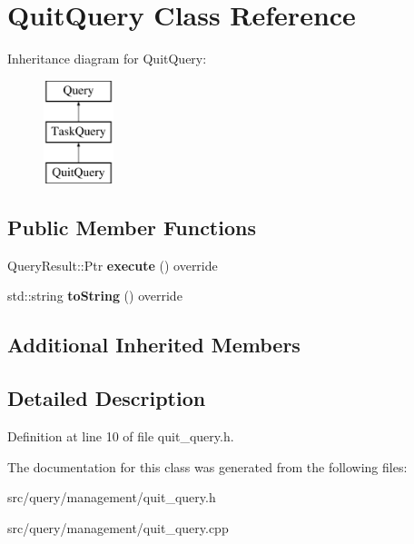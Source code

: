 \hypertarget{class_quit_query}{}\section{Quit\+Query Class Reference}
\label{class_quit_query}
Inheritance diagram for Quit\+Query\+:\begin{figure}[H]
\begin{center}
\leavevmode
\includegraphics[height=3.000000cm]{class_quit_query}
\end{center}
\end{figure}
\subsection*{Public Member Functions}
\begin{DoxyCompactItemize}
\item 
\mbox{\label{class_quit_query_a89c1e8a2fbb5948e627599bb2929de72}} 
Query\+Result\+::\+Ptr {\bfseries execute} () override
\item 
\mbox{\label{class_quit_query_a403cc76c4a64c82d19744612e9fb066e}} 
std\+::string {\bfseries to\+String} () override
\end{DoxyCompactItemize}
\subsection*{Additional Inherited Members}


\subsection{Detailed Description}


Definition at line 10 of file quit\+\_\+query.\+h.



The documentation for this class was generated from the following files\+:\begin{DoxyCompactItemize}
\item 
src/query/management/quit\+\_\+query.\+h\item 
src/query/management/quit\+\_\+query.\+cpp\end{DoxyCompactItemize}
